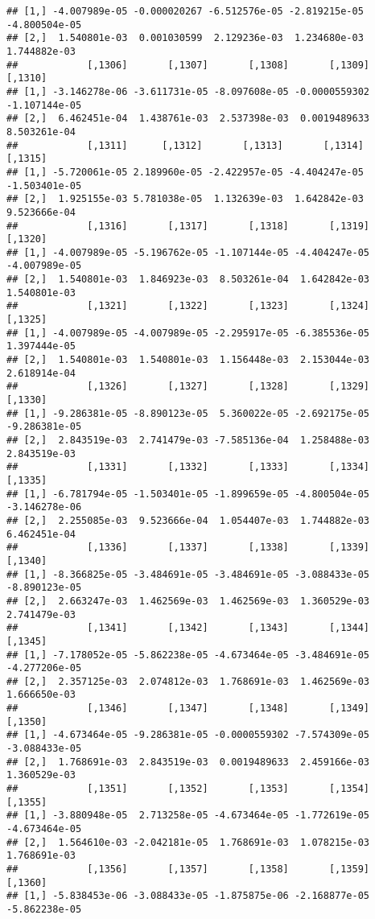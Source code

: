 \documentclass[
]{article}
\begin{document}
\begin{verbatim}
## [1,] -4.007989e-05 -0.000020267 -6.512576e-05 -2.819215e-05 -4.800504e-05
## [2,]  1.540801e-03  0.001030599  2.129236e-03  1.234680e-03  1.744882e-03
##            [,1306]       [,1307]       [,1308]       [,1309]       [,1310]
## [1,] -3.146278e-06 -3.611731e-05 -8.097608e-05 -0.0000559302 -1.107144e-05
## [2,]  6.462451e-04  1.438761e-03  2.537398e-03  0.0019489633  8.503261e-04
##            [,1311]      [,1312]       [,1313]       [,1314]       [,1315]
## [1,] -5.720061e-05 2.189960e-05 -2.422957e-05 -4.404247e-05 -1.503401e-05
## [2,]  1.925155e-03 5.781038e-05  1.132639e-03  1.642842e-03  9.523666e-04
##            [,1316]       [,1317]       [,1318]       [,1319]       [,1320]
## [1,] -4.007989e-05 -5.196762e-05 -1.107144e-05 -4.404247e-05 -4.007989e-05
## [2,]  1.540801e-03  1.846923e-03  8.503261e-04  1.642842e-03  1.540801e-03
##            [,1321]       [,1322]       [,1323]       [,1324]      [,1325]
## [1,] -4.007989e-05 -4.007989e-05 -2.295917e-05 -6.385536e-05 1.397444e-05
## [2,]  1.540801e-03  1.540801e-03  1.156448e-03  2.153044e-03 2.618914e-04
##            [,1326]       [,1327]       [,1328]       [,1329]       [,1330]
## [1,] -9.286381e-05 -8.890123e-05  5.360022e-05 -2.692175e-05 -9.286381e-05
## [2,]  2.843519e-03  2.741479e-03 -7.585136e-04  1.258488e-03  2.843519e-03
##            [,1331]       [,1332]       [,1333]       [,1334]       [,1335]
## [1,] -6.781794e-05 -1.503401e-05 -1.899659e-05 -4.800504e-05 -3.146278e-06
## [2,]  2.255085e-03  9.523666e-04  1.054407e-03  1.744882e-03  6.462451e-04
##            [,1336]       [,1337]       [,1338]       [,1339]       [,1340]
## [1,] -8.366825e-05 -3.484691e-05 -3.484691e-05 -3.088433e-05 -8.890123e-05
## [2,]  2.663247e-03  1.462569e-03  1.462569e-03  1.360529e-03  2.741479e-03
##            [,1341]       [,1342]       [,1343]       [,1344]       [,1345]
## [1,] -7.178052e-05 -5.862238e-05 -4.673464e-05 -3.484691e-05 -4.277206e-05
## [2,]  2.357125e-03  2.074812e-03  1.768691e-03  1.462569e-03  1.666650e-03
##            [,1346]       [,1347]       [,1348]       [,1349]       [,1350]
## [1,] -4.673464e-05 -9.286381e-05 -0.0000559302 -7.574309e-05 -3.088433e-05
## [2,]  1.768691e-03  2.843519e-03  0.0019489633  2.459166e-03  1.360529e-03
##            [,1351]       [,1352]       [,1353]       [,1354]       [,1355]
## [1,] -3.880948e-05  2.713258e-05 -4.673464e-05 -1.772619e-05 -4.673464e-05
## [2,]  1.564610e-03 -2.042181e-05  1.768691e-03  1.078215e-03  1.768691e-03
##            [,1356]       [,1357]       [,1358]       [,1359]       [,1360]
## [1,] -5.838453e-06 -3.088433e-05 -1.875875e-06 -2.168877e-05 -5.862238e-05

\end{verbatim}
\end{document}
